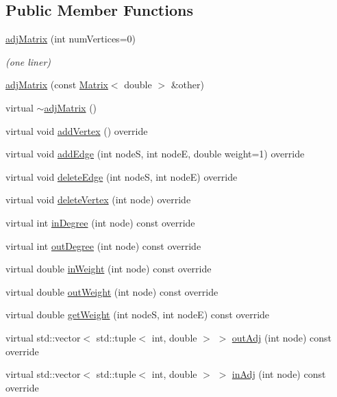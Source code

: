 \subsection*{Public Member Functions}
\begin{DoxyCompactItemize}
\item 
\hyperlink{class_alg_lib_1_1adj_matrix_afed0a27060baa109a23159a5f2685914}{adj\+Matrix} (int num\+Vertices=0)
\begin{DoxyCompactList}\small\item\em (one liner) \end{DoxyCompactList}\item 
\hyperlink{class_alg_lib_1_1adj_matrix_ac612948d3f6ded49591cc7810609a7c2}{adj\+Matrix} (const \hyperlink{class_alg_lib_1_1_matrix}{Matrix}$<$ double $>$ \&other)
\item 
virtual \hyperlink{class_alg_lib_1_1adj_matrix_ae2cdc4fe2471a1358fe0a746a67e8403}{$\sim$adj\+Matrix} ()
\item 
virtual void \hyperlink{class_alg_lib_1_1adj_matrix_a55d736fcb0d25028df7e4775d0b7fa53}{add\+Vertex} () override
\item 
virtual void \hyperlink{class_alg_lib_1_1adj_matrix_a4ca87cc5146e1a1e8967a5cd358711cc}{add\+Edge} (int nodeS, int nodeE, double weight=1) override
\item 
virtual void \hyperlink{class_alg_lib_1_1adj_matrix_ac644ad4932439fea257938c42c7f6ec3}{delete\+Edge} (int nodeS, int nodeE) override
\item 
virtual void \hyperlink{class_alg_lib_1_1adj_matrix_a7e59572f5c9c80853364132cd92eb9a0}{delete\+Vertex} (int node) override
\item 
virtual int \hyperlink{class_alg_lib_1_1adj_matrix_a50039a0fb126b3996b30e3b9fd8e7933}{in\+Degree} (int node) const  override
\item 
virtual int \hyperlink{class_alg_lib_1_1adj_matrix_afbe220e5939f2c5bb621b482904eeef0}{out\+Degree} (int node) const  override
\item 
virtual double \hyperlink{class_alg_lib_1_1adj_matrix_aab4ecb9801ba43d2ce3c0f542e44643e}{in\+Weight} (int node) const  override
\item 
virtual double \hyperlink{class_alg_lib_1_1adj_matrix_a3d807c32353c656f362ed356c4f3d1ed}{out\+Weight} (int node) const  override
\item 
virtual double \hyperlink{class_alg_lib_1_1adj_matrix_a05bbb7b2b30f83c6b89ff75dc6cc84ea}{get\+Weight} (int nodeS, int nodeE) const  override
\item 
virtual std\+::vector$<$ std\+::tuple$<$ int, double $>$ $>$ \hyperlink{class_alg_lib_1_1adj_matrix_a0e8e97ad4fba9e2862d36ab1be2324f1}{out\+Adj} (int node) const  override
\item 
virtual std\+::vector$<$ std\+::tuple$<$ int, double $>$ $>$ \hyperlink{class_alg_lib_1_1adj_matrix_a52a5e7ac8fdd3bf11aa6dcf38d800ecb}{in\+Adj} (int node) const  override
\end{DoxyCompactItemize}

